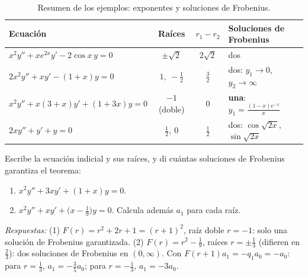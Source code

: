 \begin{table}[H]
\centering
\small
\caption{Resumen de los ejemplos: exponentes y soluciones de Frobenius.}
\label{tab:s3-resumen}
\begin{tabular}{|p{4.7cm}|c|c|p{4.6cm}|}
\hline
\rowcolor{bbe!15}\textbf{Ecuación} & \textbf{Raíces} & $r_1-r_2$ & \textbf{Soluciones de Frobenius} \\ \hline
$x^2y''+xe^{2x}y'-2\cos x\,y=0$ & $\pm\sqrt2$ & $2\sqrt2$ & dos \\ \hline
$2x^2y''+xy'-(1+x)y=0$ & $1,\ -\frac12$ & $\frac32$ & dos: $y_1\to0$, $y_2\to\infty$ \\ \hline
$x^2y''+x(3+x)y'+(1+3x)y=0$ & $-1$ (doble) & $0$ & \textbf{una}: $y_1=\frac{(1-x)e^{-x}}{x}$ \\ \hline
$2xy''+y'+y=0$ & $\frac12,\ 0$ & $\frac12$ & dos: $\cos\sqrt{2x}$, $\sin\sqrt{2x}$ \\ \hline
\end{tabular}
\end{table}
 
\begin{exercise}
Escribe la ecuación indicial y sus raíces, y di cuántas soluciones de Frobenius garantiza el teorema:
\begin{enumerate}
\item $x^2y''+3xy'+(1+x)y=0$.
\item $x^2y''+xy'+\bigl(x-\tfrac19\bigr)y=0$. Calcula además $a_1$ para cada raíz.
\end{enumerate}
\emph{Respuestas:} (1) $F(r)=r^2+2r+1=(r+1)^2$, raíz doble $r=-1$: solo una solución de Frobenius garantizada. \; (2) $F(r)=r^2-\frac19$, raíces $r=\pm\frac13$ (difieren en $\frac23$): dos soluciones de Frobenius en $(0,\infty)$. Con $F(r+1)a_1=-q_1a_0=-a_0$: para $r=\frac13$, $a_1=-\frac35a_0$; para $r=-\frac13$, $a_1=-3a_0$.
\end{exercise}
